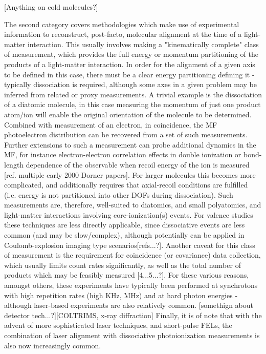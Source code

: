 [Anything on cold molecules?]

The second category covers methodologies which make use of experimental information to reconstruct, post-facto, molecular alignment at the time of a light-matter interaction. This usually involves making a "kinematically complete" class of measurement, which provides the full energy or momentum partitioning of the products of a light-matter interaction. In order for the alignment of a given axis to be defined in this case, there must be a clear energy partitioning defining it - typically dissociation is required, although some axes in a given problem may be inferred from related or proxy measurements. A trivial example is the dissociation of a diatomic molecule, in this case measuring the momentum of just one product atom/ion will enable the original orientation of the molecule to be determined. Combined with measurement of an electron, in coincidence, the MF photoelectron distribution can be recovered from a set of such measurements. Further extensions to such a measurement can probe additional dynamics in the MF, for instance electron-electron correlation effects in double ionization or bond-length dependence of the observable when recoil energy of the ion is measured [ref. multiple early 2000 Dorner papers]. For larger molecules this becomes more complicated, and additionally requires that axial-recoil conditions are fulfilled (i.e. energy is not partitioned into other DOFs during dissociation). Such measurements are, therefore, well-suited to diatomics, and small polyatomics, and light-matter interactions involving core-ionization(s) events. For valence studies these techniques are less directly applicable, since dissociative events are less common (and may be slow/complex), although potentially can be applied in Coulomb-explosion imaging type scenarios[refs...?]. Another caveat for this class of measurement is the requirement for coincidence (or covariance) data collection, which usually limits count rates significantly, as well as the total number of products which may be feasibly measured [4...5...?]. For these various reasons, amongst others, these experiments have typically been performed at synchrotons with high repetition rates (high KHz, MHz) and at hard photon energies - although laser-based experiments are also relatively common. [somethign about detector tech...?][COLTRIMS, x-ray diffraction] Finally, it is of note that with the advent of more sophisticated laser techniques, and short-pulse FELs, the combination of laser alignment with dissociative photoionization measurements is also now increasingly common.

